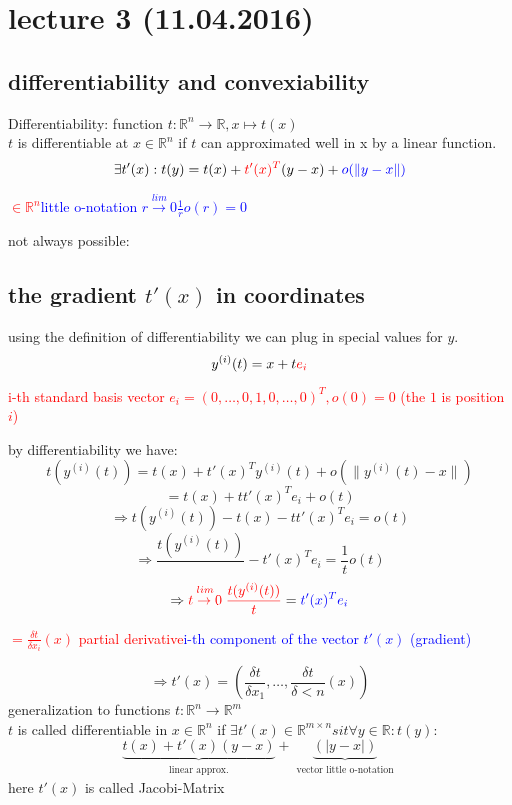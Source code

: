 \section*{lecture 3 (11.04.2016)}
\subsection*{differentiability and convexiability}

Differentiability: function $t: \mathbb{R}^n \rightarrow \mathbb{R}, x \mapsto t(x)$\\
$t$ is differentiable at $x \in \mathbb{R}^n$ if $t$ can approximated well in x by a linear function.
\[\exists t'(x): t(y) = t(x) + \textcolor{red}{t'(x)^T} (y-x) + \textcolor{blue}{o(\lVert y-x\lVert)}\]
\begin{center}
\textcolor{red}{$\in \mathbb{R}^n$}\space\space\textcolor{blue}{little o-notation $\stackrel{lim}{r \rightarrow 0} \frac{1}{r} o(r) = 0$} 
\end{center}
not always possible:
\subsection*{the gradient $t'(x)$ in coordinates}
using the definition of differentiability we can plug in special values for $y$.
\[y^{(i)}(t) = x + t\textcolor{red}{e_i}\]
\begin{center}
 \textcolor{red}{i-th standard basis vector $e_i = (0, \dots, 0,1,0, \dots ,0)^T, o(0)=0$ (the $1$ is position $i$)}
\end{center}
by differentiability we have:
\[t(y^{(i)}(t)) = t(x) + t'(x)^Ty^{(i)}(t) + o(\lVert y^{(i)}(t)-x\lVert)\]
\[= t(x) + tt'(x)^Te_i+o(t)\]
\[\Rightarrow t(y^{(i)}(t)) - t(x) - tt'(x)^Te_i = o(t)\]
\[\Rightarrow \frac{t(y^{(i)}(t))}{} - t'(x)^{T}e_i = \frac{1}{t} o(t)\]
\[\Rightarrow \textcolor{red}{\stackrel{lim}{t \rightarrow 0} \frac{t(y^{(i)}(t))}{t}} = \textcolor{blue}{t'(x)^Te_i}\]
\begin{center}
 \textcolor{red}{$= \frac{\delta t}{\delta x_i}(x)$ partial derivative}\space\space\textcolor{blue}{i-th component of the vector $t'(x)$ (gradient)}
\end{center}
\[\Rightarrow t'(x) = (\frac{\delta t}{\delta x_1}, \dots , \frac{\delta t}{\delta < n}(x))\]
generalization to functions $t: \mathbb{R}^n \rightarrow \mathbb{R}^m$\\
$t$ is called differentiable in $x \in \mathbb{R}^n$ if $\exists t'(x)\in\mathbb{R}^{m \times n} sit \forall y \in \mathbb{R}: t(y):$
\[ \underbrace{t(x)+t'(x)(y-x)}_{\substack{\text{linear approx.}}}+\underbrace{(|y-x|)}_{\substack{\text{vector little o-notation}}}\] 
here  $t'(x)$ is called Jacobi-Matrix\\\\

